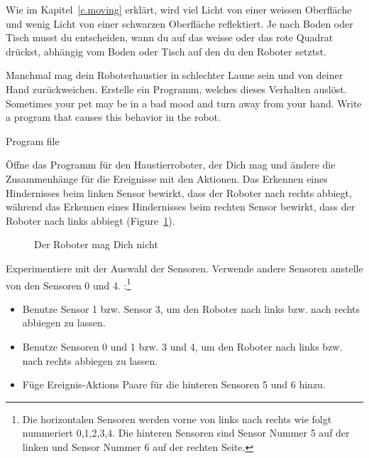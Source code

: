 Wie im Kapitel~\ref{c.moving} erklärt,
wird viel Licht von einer weissen Oberfläche
und wenig Licht von einer schwarzen Oberfläche reflektiert.
Je nach Boden oder Tisch musst du entscheiden,
wann du auf das weisse oder das rote Quadrat drückst,
abhängig vom Boden oder Tisch auf den du den Roboter setztst.

\newpage


Manchmal mag dein Roboterhaustier in schlechter Laune sein und von deiner Hand zurückweichen. Erstelle ein Programm, welches dieses Verhalten auslöst.
Sometimes your pet may be in a bad mood and turn away from your hand.
Write a program that causes this behavior in the robot.

{\raggedleft \hfill Program file }

Öffne das Programm für den Haustierroboter, 
der Dich mag und ändere die Zusammenhänge für die Ereignisse mit den Aktionen. 
Das Erkennen eines Hindernisses beim linken Sensor bewirkt, 
dass der Roboter nach rechts abbiegt, 
während das Erkennen eines Hindernisses beim rechten Sensor bewirkt, 
dass der Roboter nach links abbiegt (Figure~\ref{fig.hates}).

\begin{figure}[htb]
\begin{center}
\caption{Der Roboter mag Dich nicht}
\label{fig.hates}
\end{center}
\end{figure}


Experimentiere mit der Auswahl der Sensoren.
Verwende andere Sensoren anstelle von den Sensoren 0 und 4.
:\footnote{Die horizontalen Sensoren werden vorne von links nach rechts wie folgt nummeriert 0,1,2,3,4.
Die hinteren Sensoren sind Sensor Nummer 5 auf der linken und Sensor Nummer 6 auf der rechten Seite.}

\begin{itemize}

\item Benutze Sensor 1 bzw. Sensor 3, um den Roboter nach links bzw. nach rechts abbiegen zu lassen.
\item Benutze Sensoren 0 und 1 bzw. 3 und 4, um den Roboter nach links bzw. nach rechts abbiegen zu lassen.
\item Füge Ereignis-Aktions Paare für die hinteren Sensoren 5 und 6 hinzu.
\end{itemize}

